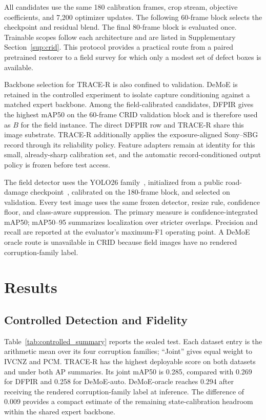 \documentclass[journal]{IEEEtran}
\newcommand{\tracer}{TRACE-R\xspace}
\begin{document}
All candidates use the same 180 calibration frames, crop stream, objective coefficients, and 7,200 optimizer updates. The following 60-frame block selects the checkpoint and residual blend. The final 80-frame block is evaluated once. Trainable scopes follow each architecture and are listed in Supplementary Section~\ref{sup:crid}. This protocol provides a practical route from a paired pretrained restorer to a field survey for which only a modest set of defect boxes is available.

Backbone selection for TRACE-R is also confined to validation. DeMoE is retained in the controlled experiment to isolate capture conditioning against a matched expert backbone. Among the field-calibrated candidates, DFPIR gives the highest mAP50 on the 60-frame CRID validation block and is therefore used as $B$ for the field instance. The direct DFPIR row and TRACE-R share this image substrate. TRACE-R additionally applies the exposure-aligned Sony--SBG record through its reliability policy. Feature adapters remain at identity for this small, already-sharp calibration set, and the automatic record-conditioned output policy is frozen before test access.

The field detector uses the YOLO26 family~\cite{jocher2026yolo26}, initialized from a public road-damage checkpoint~\cite{tamako2026yolo26rddfrdc}, calibrated on the 180-frame block, and selected on validation. Every test image uses the same frozen detector, resize rule, confidence floor, and class-aware suppression. The primary measure is confidence-integrated mAP50; mAP50--95 summarizes localization over stricter overlaps. Precision and recall are reported at the evaluator's maximum-F1 operating point. A DeMoE oracle route is unavailable in CRID because field images have no rendered corruption-family label.

\section{Results}
\subsection{Controlled Detection and Fidelity}
Table~\ref{tab:controlled_summary} reports the sealed test. Each dataset entry is the arithmetic mean over its four corruption families; ``Joint'' gives equal weight to IVCNZ and PCM. \tracer has the highest deployable score on both datasets and under both AP summaries. Its joint mAP50 is 0.285, compared with 0.269 for DFPIR and 0.258 for DeMoE-auto. DeMoE-oracle reaches 0.294 after receiving the rendered corruption-family label at inference. The difference of 0.009 provides a compact estimate of the remaining state-calibration headroom within the shared expert backbone.
\end{document}
